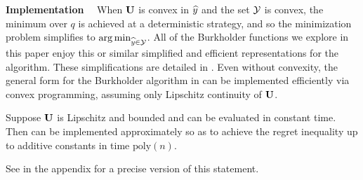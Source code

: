 \noindent\textbf{Implementation}~~ When $\mathbf{U}$ is convex in ${\widehat{y}}$ and the set $\mathcal{Y}$ is convex, the minimum over $q$ is achieved at a deterministic strategy, and so the  minimization problem simplifies to $\operatorname*{arg\,min}_{{\widehat{y}}\in\mathcal{Y}}$. All of the Burkholder functions we explore in this paper enjoy this or similar simplified and efficient representations for the algorithm. These simplifications are detailed in . Even without convexity, the general form for the Burkholder algorithm in  can be implemented efficiently via convex programming, assuming only Lipschitz continuity of $\mathbf{U}$.
\begin{proposition}
Suppose $\mathbf{U}$ is Lipschitz and bounded and can be evaluated in constant time. Then  can be implemented approximately so as to achieve the regret inequality  up to additive constants in time $\textrm{poly}(n)$.
\end{proposition}
See  in the appendix for a precise version of this statement.

